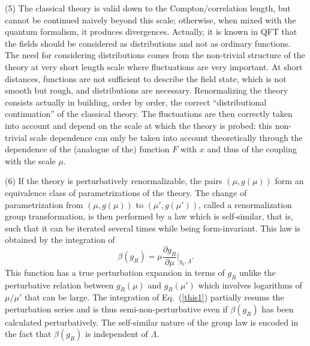 \documentclass[floatfix,preprintnumbers,amsmath,amssymb,prb,12pt]{revtex4-1}
\begin{document}
{(5) The classical theory is valid down to the Compton/correlation
length, but cannot be continued naively beyond this scale;
otherwise, when mixed with the quantum formalism, it produces
divergences. Actually, it is known in QFT that the fields should
be considered as distributions and not as ordinary functions.
The need for considering distributions comes from the non-trivial structure of the
theory at very short length scale where fluctuations are very
important. At short distances, functions
are not sufficient to describe the field state, which is not smooth
but rough, and distributions are necessary. Renormalizing the
theory consists actually in building, order by order, the correct
``distributional continuation'' of the classical theory. The
fluctuations are then correctly taken into account and depend on
the scale at which the theory is probed: this non-trivial scale
dependence can only be taken into account theoretically through
the dependence of the (analogue of the) function
$F$ with $x$ and thus of the coupling with the scale
$\mu$.

(6) If the theory is perturbatively renormalizable, the pairs
$(\mu,g(\mu))$ form an equivalence class of parametrizations of
the theory. The change of parametrization from $(\mu,g(\mu))$ to
$(\mu',g(\mu'))$, called a renormalization group transformation,
is then performed by a law which is self-similar, that is, such
that it can be iterated several times while being
form-invariant.\cite{kovalev99,shirkov01} This law is obtained by
the integration of 
\begin{equation}
\beta(g_R)=\mu\frac{\partial
g_R}{\partial\mu}\bigg|_{g_0,\Lambda}.
\label{this1}
\end{equation}
This function has a true perturbation expansion in terms of $g_R$
unlike the perturbative relation between
$g_R(\mu)$ and $g_R(\mu')$ which involves logarithms of $\mu/\mu'$
that can be large. The integration of Eq.~(\ref{this1}) 
partially resums the perturbation series and is thus
semi-non-perturbative even if
$\beta(g_R)$ has been calculated perturbatively. The self-similar
nature of the group law is encoded in the fact that $\beta(g_R)$
is independent of
$\Lambda$.\cite{lebellac91}

}
\end{document}
